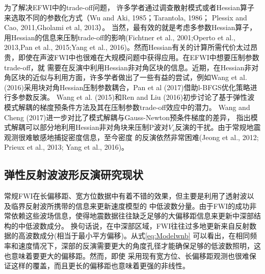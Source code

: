 为了解决EFWI中的trade-off问题，
许多学者通过调查散射模式或者Hessian算子来选取不同的参数化方式（Wu and Aki, 1985\cite{wu.aki:1985}；Tarantola, 1986\cite{tarantola:1986}；
Plessix and Cao, 2011\cite{plessix.cao:2011},Gholami et al, 2013\cite{gholami2013}）。
当然，最有效的就是考虑多参数Hessian算子，用Hessian的信息来压制trade-off的影响(Fichtner et al., 2001\cite{fichtner2011hessian};Operto et al.,
2013\cite{operto2013guided},Pan et al., 2015\cite{pan2015estimation};Yang et al.,
2016\cite{Yang2016})。然而Hessian有关的计算所需代价太过昂贵，即使在声波FWI中也很难在大规模问题中获得应用。在EFWI中想要压制参数trade-off，就
需要在反演中利用Hessian非对角区块的信息。近期，在Hessian非对角区块的近似与利用方面，许多学者做出了一些有益的尝试，例如Wang
et al. (2016)\cite{WangYuweiEtAl2016}采用块对角Hessian压制参数耦合，Pan et
al (2017)\cite{PanEtAl2017}借助l-BFGS优化策略进行多参数反演。
Wang et al. (2015)\cite{wang:2015}和Ren and                                                                           
Liu
(2016)\cite{ren.liu:2016}初步讨论了基于弹性波模式解耦的梯度预条件方法及其在压制参数trade-off效应中的潜力。
Wang and Cheng (2017)\cite{WangEtAl2017}进一步对比了模式解耦与Gauss-Newton预条件梯度的差异，
指出模式解耦可以部分地利用Hessian非对角块来压制P波对$V_s$反演的干扰。由于常规地震观测很难敏感地捕捉密度信息，至今密度
的反演依然非常困难(Jeong et al., 2012\cite{jeong2012full}; Prieux et al., 2013\cite{prieux:2013a}; Yang
et al., 2016\cite{Yang2016})。
\subsection{弹性反射波波形反演研究现状}
常规FWI在长偏移距、宽方位数据中有着不错的效果，但主要是利用了透射波以及临界反射波所携带的信息来更新速度模型的
中低波数分量。由于FWI的成功非常依赖这些波场信息，使得地震数据往往缺乏足够的大偏移距信息来更新中深部结构的中低波数成分。
换句话说，在中深部区域，FWI往往过多地更新来自反射数据的高波数成分(相当于最小平方偏移)。从式\eqref{eq:Modelwnb}
可以看出，在相同频率和速度情况下，深部的反演需要更大的角度孔径才能确保足够的低波数照明，这也意味着要更大的偏移距。然而，即使
采用现有宽方位、长偏移距观测也很难保证这样的覆盖，而且更长的偏移距也意味着更强的非线性\cite{sirgue2006importance,virieux2009overview}。

